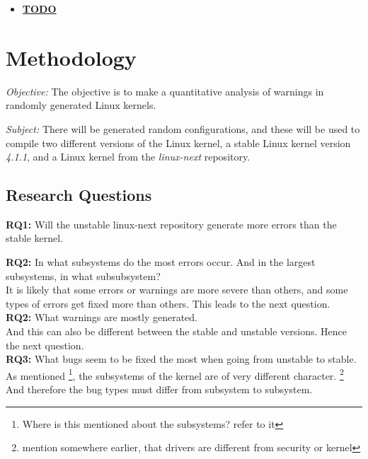 \documentclass[a4paper,11pt]{report}
\begin{document}
\begin{itemize}
    \item \underline{\textbf{TODO}}
\end{itemize}


\newpage
\chapter{Methodology}

\emph{Objective:}
The objective is to make a quantitative analysis of warnings in randomly 
generated Linux kernels. 

\emph{Subject:}
There will be generated random configurations, and these will be used to 
compile two different versions of the Linux kernel, a stable Linux kernel 
version \emph{4.1.1}, and a Linux kernel from the \emph{linux-next} repository.


\section{Research Questions}

\textbf{RQ1:} Will the unstable linux-next repository generate more errors than 
the stable kernel.

\textbf{RQ2:} In what subsystems do the most errors occur. And in the largest 
subsystems, in what subsubsystem? 
\\

It is likely that some errors or warnings are more severe than others, and some 
types of errors get fixed more than others. This leads to the next question.
\\

\textbf{RQ2:} What warnings are mostly generated.  
\\

And this can also be different between the stable and unstable versions. Hence 
the next question. 
\\

\textbf{RQ3:} What bugs seem to be fixed the most when going from unstable to 
stable. 
\\

As mentioned \footnote{Where is this mentioned about the subsystems? refer to 
it}, the subsystems of the kernel are of very different character. 
\footnote{mention somewhere earlier, that drivers are different from security 
or kernel} And therefore the bug types must differ from subsystem to subsystem. 
\\
\end{document}
